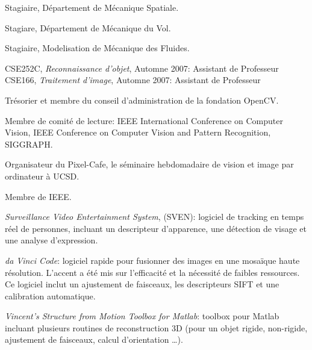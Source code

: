 \begin{llist}
Stagiaire, D\'{e}partement de M\'{e}canique Spatiale.

 
Stagiare, D\'{e}partement de M\'{e}canique du Vol.

 
Stagiaire, Modelisation de M\'{e}canique des Fluides.

CSE252C, {\em Reconnaissance d'objet}, Automne 2007: Assistant de Professeur\\
CSE166, {\em Traitement d'image}, Automne 2007: Assistant de Professeur


Tr\'{e}sorier et membre du conseil d'administration de la fondation OpenCV.

Membre de comit\'{e} de lecture: IEEE International Conference on Computer Vision, IEEE Conference on Computer Vision and Pattern Recognition, SIGGRAPH.

Organisateur du Pixel-Cafe, le s\'{e}minaire hebdomadaire de vision et image par ordinateur \`{a} UCSD.

Membre de IEEE.





{\em Surveillance Video Entertainment System}, (SVEN): logiciel de tracking en temps r\'eel de personnes, incluant un descripteur d'apparence, une d\'{e}tection de visage et une analyse d'expression.

{\em da Vinci Code}: logiciel rapide pour fusionner des images en une mosa\"{i}que haute r\'{e}solution.  L'accent a \'{e}t\'{e} mis sur l'efficacit\'{e} et la n\'{e}cessit\'{e} de faibles ressources.  Ce logiciel inclut un ajustement de faisceaux, les descripteurs SIFT et une calibration automatique.

{\em Vincent's Structure from Motion Toolbox for Matlab}: toolbox pour Matlab incluant plusieurs routines de reconstruction 3D (pour un objet rigide, non-rigide, ajustement de faisceaux, calcul d'orientation \dots).


\end{llist}

